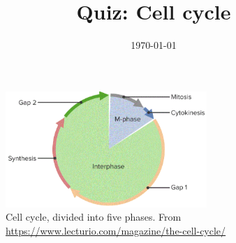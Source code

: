 \documentclass[quiz,addpoints,noanswers]{exam}
\title{Quiz: Cell cycle}
\date{\today}
\author{\mobeardInstructorShort}
\begin{document}
\maketitle

\begin{figure}[h]
\begin{center}
\includegraphics[width=3in]{cellcycle.png}
\end{center}
\caption{Cell cycle, divided into five phases. From \url{https://www.lecturio.com/magazine/the-cell-cycle/}}
\end{figure}
\end{document}
